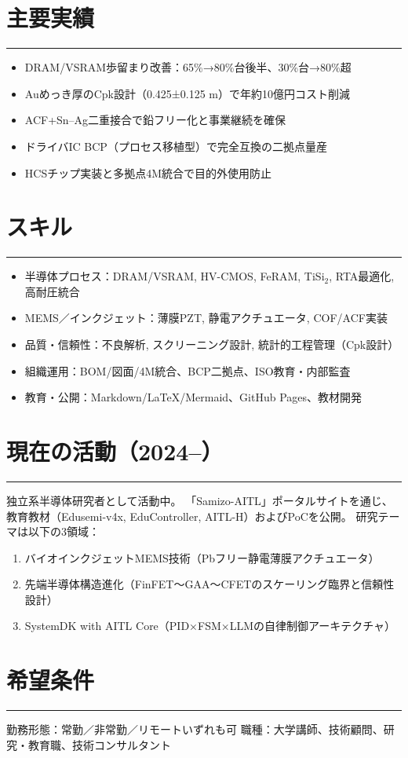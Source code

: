 \documentclass[11pt]{bxjsarticle}
\newcommand{\cvsection}[1]{\section*{#1}\vspace{-0.3em}\hrule\vspace{0.5em}}
\begin{document}
\cvsection{主要実績}
\begin{itemize}
  \item DRAM/VSRAM歩留まり改善：65\%→80\%台後半、30\%台→80\%超
  \item Auめっき厚のCpk設計（0.425±0.125 \textmu m）で年約10億円コスト削減
  \item ACF+Sn–Ag二重接合で鉛フリー化と事業継続を確保
  \item ドライバIC BCP（プロセス移植型）で完全互換の二拠点量産
  \item HCSチップ実装と多拠点4M統合で目的外使用防止
\end{itemize}

\cvsection{スキル}
\begin{itemize}
  \item 半導体プロセス：DRAM/VSRAM, HV-CMOS, FeRAM, TiSi$_2$, RTA最適化, 高耐圧統合
  \item MEMS／インクジェット：薄膜PZT, 静電アクチュエータ, COF/ACF実装
  \item 品質・信頼性：不良解析, スクリーニング設計, 統計的工程管理（Cpk設計）
  \item 組織運用：BOM/図面/4M統合、BCP二拠点、ISO教育・内部監査
  \item 教育・公開：Markdown/LaTeX/Mermaid、GitHub Pages、教材開発
\end{itemize}

\cvsection{現在の活動（2024–）}
独立系半導体研究者として活動中。  
「Samizo-AITL」ポータルサイトを通じ、教育教材（Edusemi-v4x, EduController, AITL-H）およびPoCを公開。  
研究テーマは以下の3領域：
\begin{enumerate}
  \item バイオインクジェットMEMS技術（Pbフリー静電薄膜アクチュエータ）
  \item 先端半導体構造進化（FinFET～GAA～CFETのスケーリング臨界と信頼性設計）
  \item SystemDK with AITL Core（PID×FSM×LLMの自律制御アーキテクチャ）
\end{enumerate}

\cvsection{希望条件}
勤務形態：常勤／非常勤／リモートいずれも可  
職種：大学講師、技術顧問、研究・教育職、技術コンサルタント
\end{document}
